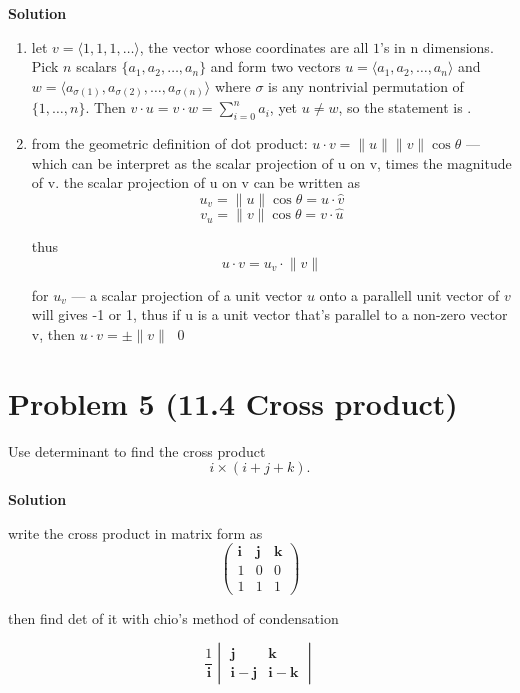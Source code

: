 \documentclass{article}
\newcommand{\solution}{\textbf{\large Solution}}
\theoremstyle{remark}
\begin{document}
\medskip
\solution

\begin{enumerate}[label=(\alph*)]
    \item let $v = \langle 1, 1, 1, \dots \rangle$, the vector whose coordinates are all $1$'s in n dimensions. Pick $n$ scalars $\{a_1, a_2, \dots, a_n\}$ and form two vectors $u = \langle a_1, a_2, \dots, a_n \rangle$ and $w = \langle a_{\sigma(1)}, a_{\sigma(2)}, \dots, a_{\sigma(n)} \rangle$ where $\sigma$ is any nontrivial permutation of $\{1, \dots, n\}$. Then $v \cdot u = v \cdot w = \sum_{i = 0}^{n} a_i$, yet $u \neq w$, so the statement is .
    \item from the geometric definition of dot product: $u \cdot v = \lVert u \lVert \lVert v \lVert \cos\theta$ --- which can be interpret as the scalar projection of u on v, times the magnitude of v. the scalar projection of u on v can be written as 
        \[u_v = \lVert u \lVert \cos\theta = u \cdot \hat{v}\]
        \[v_u = \lVert v \lVert \cos\theta = v \cdot \hat{u}\]
    
    thus 
        \[u \cdot v = u_v \cdot \lVert v \lVert\]

    for $u_v$ --- a scalar projection of a unit vector $u$ onto a parallell unit vector of $v$ will gives -1 or 1, thus if u is a unit vector that's parallel to a non-zero vector v, then $u \cdot v = \pm \lVert v \lVert$
    \qed
\end{enumerate}

\vspace{1em}
\hrulefill

\section*{Problem 5 (11.4 Cross product)}
Use determinant to find the cross product
\[
    i \times (i + j + k).
\]

\medskip
\solution

write the cross product in matrix form as
\[
    \begin{pmatrix}
        \mathbf{i} & \mathbf{j} & \mathbf{k} \\
        1 & 0 & 0 \\
        1 & 1 & 1
    \end{pmatrix}
\]

then find det of it with chio's method of condensation

\[
    \frac{1}{\mathbf{i}}
    \begin{vmatrix}
        \mathbf{j} & \mathbf{k} \\
        \mathbf{i} - \mathbf{j} & \mathbf{i} - \mathbf{k}
    \end{vmatrix}
\]
\end{document}

